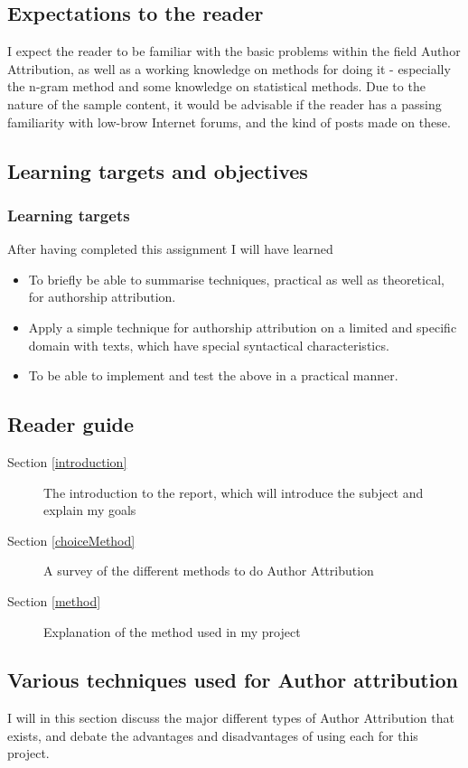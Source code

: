 \subsection{Expectations to the reader}
\label{expectations}
I expect the reader to be familiar with the basic problems within the field Author Attribution, as well as a working knowledge on methods for doing it - especially the n-gram method and some knowledge on statistical methods. Due to the nature of the sample content, it would be advisable if the reader has a passing familiarity with low-brow Internet forums, and the kind of posts made on these.

\subsection{Learning targets and objectives}
\label{lerning}
\subsubsection{Learning targets}
After having completed this assignment I will have learned 
\begin{itemize}
\item To briefly be able to summarise techniques, practical as well as theoretical, for authorship attribution.
\item Apply a simple technique for authorship attribution on a limited and specific domain with texts, which have special syntactical characteristics.
\item To be able to implement and test the above in a practical manner.
\end{itemize}

\subsection{Reader guide}
\begin{description}
\item[Section \ref{introduction}] The introduction to the report, which will introduce the subject and explain my goals
\item[Section \ref{choiceMethod}] A survey of the different methods to do Author Attribution  
\item[Section \ref{method}] Explanation of the method used in my project 
\end{description}

\subsection{Various techniques used for Author attribution}
\label{techniques}
I will in this section discuss the major different types of Author Attribution that exists, and debate the advantages and disadvantages of using each for this project.

